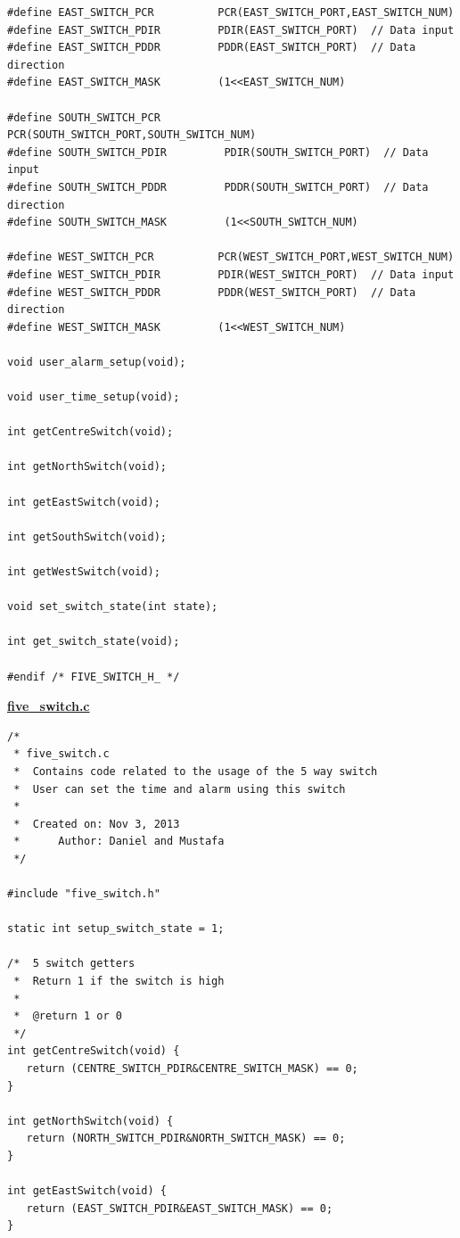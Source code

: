 \documentclass{article}
\begin{document}
\begin{landscape}
\begin{lstlisting}[frame=single]
#define EAST_SWITCH_PCR          PCR(EAST_SWITCH_PORT,EAST_SWITCH_NUM)
#define EAST_SWITCH_PDIR         PDIR(EAST_SWITCH_PORT)  // Data input
#define EAST_SWITCH_PDDR         PDDR(EAST_SWITCH_PORT)  // Data direction
#define EAST_SWITCH_MASK         (1<<EAST_SWITCH_NUM)

#define SOUTH_SWITCH_PCR          PCR(SOUTH_SWITCH_PORT,SOUTH_SWITCH_NUM)
#define SOUTH_SWITCH_PDIR         PDIR(SOUTH_SWITCH_PORT)  // Data input
#define SOUTH_SWITCH_PDDR         PDDR(SOUTH_SWITCH_PORT)  // Data direction
#define SOUTH_SWITCH_MASK         (1<<SOUTH_SWITCH_NUM)

#define WEST_SWITCH_PCR          PCR(WEST_SWITCH_PORT,WEST_SWITCH_NUM)
#define WEST_SWITCH_PDIR         PDIR(WEST_SWITCH_PORT)  // Data input
#define WEST_SWITCH_PDDR         PDDR(WEST_SWITCH_PORT)  // Data direction
#define WEST_SWITCH_MASK         (1<<WEST_SWITCH_NUM)

void user_alarm_setup(void);

void user_time_setup(void);

int getCentreSwitch(void);

int getNorthSwitch(void);

int getEastSwitch(void);

int getSouthSwitch(void);

int getWestSwitch(void);

void set_switch_state(int state);

int get_switch_state(void);

#endif /* FIVE_SWITCH_H_ */
\end{lstlisting}

\bf{\underline{five\_switch.c}}
\begin{lstlisting}[frame=single]
/*
 * five_switch.c
 * 	Contains code related to the usage of the 5 way switch
 * 	User can set the time and alarm using this switch
 *
 *  Created on: Nov 3, 2013
 *      Author: Daniel and Mustafa
 */

#include "five_switch.h"

static int setup_switch_state = 1;

/*	5 switch getters
 * 	Return 1 if the switch is high
 * 	
 * 	@return 1 or 0
 */
int getCentreSwitch(void) {
   return (CENTRE_SWITCH_PDIR&CENTRE_SWITCH_MASK) == 0;
}

int getNorthSwitch(void) {
   return (NORTH_SWITCH_PDIR&NORTH_SWITCH_MASK) == 0;
}

int getEastSwitch(void) {
   return (EAST_SWITCH_PDIR&EAST_SWITCH_MASK) == 0;
}


\end{lstlisting}
\end{landscape}
\end{document}
